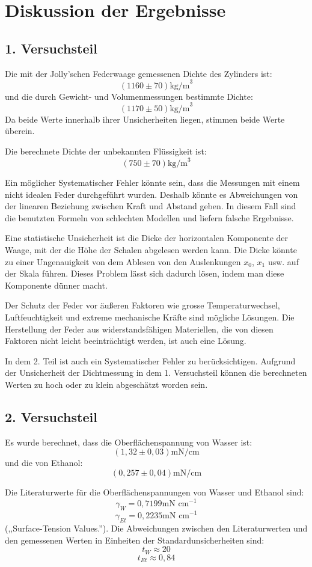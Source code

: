 \documentclass[11pt,a4paper]{article} %
\begin{document}
\section{Diskussion der Ergebnisse}
\subsection{1. Versuchsteil}
Die mit der Jolly'schen Federwaage gemessenen Dichte des Zylinders ist:
$$(1160\pm 70)\textrm{kg/m}^3$$
und die durch Gewicht- und Volumenmessungen bestimmte Dichte:
$$(1170\pm 50)\textrm{kg/m}^3$$
Da beide Werte innerhalb ihrer Unsicherheiten liegen, stimmen beide Werte überein. 

Die berechnete Dichte der unbekannten Flüssigkeit ist:
$$(750 \pm 70) \textrm{kg/m}^3$$

Ein möglicher Systematischer Fehler könnte sein, dass die Messungen mit einem nicht idealen Feder durchgeführt wurden. Deshalb könnte es Abweichungen von der linearen Beziehung zwischen Kraft und Abstand geben. In diesem Fall sind die benutzten Formeln von schlechten Modellen und liefern falsche Ergebnisse. 

Eine statistische Unsicherheit ist die Dicke der horizontalen Komponente der Waage, mit der die Höhe der Schalen abgelesen werden kann. Die Dicke könnte zu einer Ungenauigkeit von dem Ablesen von den Auslenkungen $x_0$, $x_1$ usw. auf der Skala führen. Dieses Problem lässt sich dadurch lösen, indem man diese Komponente dünner macht. 

Der Schutz der Feder vor äußeren Faktoren wie grosse 
Temperaturwechsel, Luftfeuchtigkeit und extreme mechanische Kräfte sind mögliche Lösungen. Die Herstellung der Feder aus widerstandsfähigen Materiellen, die von diesen Faktoren nicht leicht beeinträchtigt werden, ist auch eine Lösung. 

In dem 2. Teil ist auch ein Systematischer Fehler zu berücksichtigen. Aufgrund der Unsicherheit der Dichtmessung in dem 1. Versuchsteil können die berechneten Werten zu hoch oder zu klein abgeschätzt worden sein.

\subsection{2. Versuchsteil}
Es wurde berechnet, dass die Oberflächenspannung von Wasser ist:
$$(1,32\pm 0,03) \textrm{mN/cm}$$
und die von Ethanol:
$$(0,257 \pm 0,04) \textrm{mN/cm}$$

Die Literaturwerte für die Oberflächenspannungen von Wasser und Ethanol sind:
$$\gamma_W = 0,7199 \textrm{mN cm}^{-1}$$
$$\gamma_{Et} = 0,2235 \textrm{mN cm}^{-1}$$
(,,Surface-Tension Values.'').
Die Abweichungen zwischen den Literaturwerten und den gemessenen Werten in Einheiten der Standardunsicherheiten sind:
$$ t_W \approx 20 $$
$$ t_{Et} \approx 0,84$$
\end{document}
